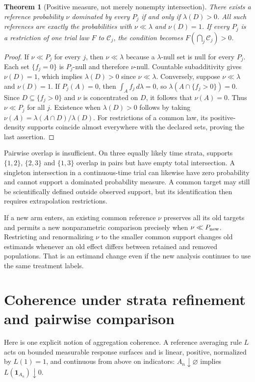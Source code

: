 \documentclass[11pt]{article}
\newtheorem{theorem}{Theorem}
\theoremstyle{remark}\newtheorem{remark}[theorem]{Remark}
\newcommand{\Ind}{\mathbf 1}
\begin{document}
\begin{theorem}[Positive measure, not merely nonempty intersection]\label{support}
There exists a reference probability $\nu$ dominated by every $P_j$ if and only if $\lambda(D)>0$. All such references are exactly the probabilities with $\nu\ll\lambda$ and $\nu(D)=1$. If every $P_j$ is a restriction of one trial law $F$ to $\mathcal C_j$, the condition becomes $F(\bigcap_j\mathcal C_j)>0$.
\end{theorem}
\begin{proof}
If $\nu\ll P_j$ for every $j$, then $\nu\ll\lambda$ because a $\lambda$-null set is null for every $P_j$. Each set $\{f_j=0\}$ is $P_j$-null and therefore $\nu$-null. Countable subadditivity gives $\nu(D)=1$, which implies $\lambda(D)>0$ since $\nu\ll\lambda$.
Conversely, suppose $\nu\ll\lambda$ and $\nu(D)=1$. If $P_j(A)=0$, then $\int_A f_j\,d\lambda=0$, so $\lambda(A\cap\{f_j>0\})=0$. Since $D\subseteq\{f_j>0\}$ and $\nu$ is concentrated on $D$, it follows that $\nu(A)=0$. Thus $\nu\ll P_j$ for all $j$. Existence when $\lambda(D)>0$ follows by taking $\nu(A)=\lambda(A\cap D)/\lambda(D)$. For restrictions of a common law, its positive-density supports coincide almost everywhere with the declared sets, proving the last assertion.
\end{proof}

Pairwise overlap is insufficient. On three equally likely time strata, supports $\{1,2\}$, $\{2,3\}$ and $\{1,3\}$ overlap in pairs but have empty total intersection. A singleton intersection in a continuous-time trial can likewise have zero probability and cannot support a dominated probability measure. A common target may still be scientifically defined outside observed support, but its identification then requires extrapolation restrictions.

If a new arm enters, an existing common reference $\nu$ preserves all its old targets and permits a new nonparametric comparison precisely when $\nu\ll P_{\rm new}$. Restricting and renormalizing $\nu$ to the smaller common support changes old estimands whenever an old effect differs between retained and removed populations. That is an estimand change even if the new analysis continues to use the same treatment labels.

\section{Coherence under strata refinement and pairwise comparison}
Here is one explicit notion of aggregation coherence. A reference averaging rule $L$ acts on bounded measurable response surfaces and is linear, positive, normalized by $L(1)=1$, and continuous from above on indicators: $A_n\downarrow\varnothing$ implies $L(\Ind_{A_n})\downarrow0$.
\end{document}
